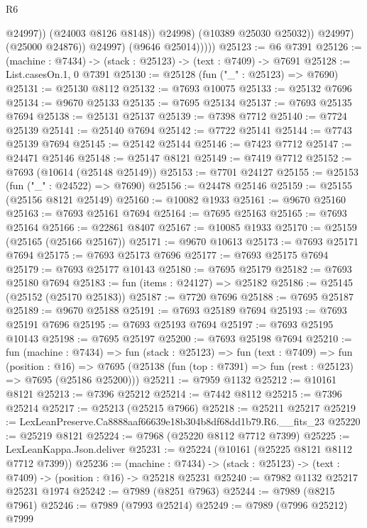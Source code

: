 \begin{lexlean}{R6}
\begin{coremodule}
                            @24997))
                        (@24003 @8126 @8148))
                      @24998)
                    (@10389 @25030 @25032))
                  @24997)
                (@25000 @24876))
              @24997)
            (@9646 @25014)))))
@25123 := @6 @7391
@25126 := (machine : @7434) -> (stack : @25123) -> (text : @7409) -> @7691
@25128 := List.casesOn.{1, 0} @7391
@25130 := @25128 (fun ("_" : @25123) => @7690)
@25131 := @25130 @8112
@25132 := @7693 @10075
@25133 := @25132 @7696
@25134 := @9670 @25133
@25135 := @7695 @25134
@25137 := @7693 @25135 @7694
@25138 := @25131 @25137
@25139 := @7398 @7712
@25140 := @7724 @25139
@25141 := @25140 @7694
@25142 := @7722 @25141
@25144 := @7743 @25139 @7694
@25145 := @25142 @25144
@25146 := @7423 @7712
@25147 := @24471 @25146
@25148 := @25147 @8121
@25149 := @7419 @7712
@25152 := @7693 (@10614 (@25148 @25149))
@25153 := @7701 @24127
@25155 := @25153 (fun ("_" : @24522) => @7690)
@25156 := @24478 @25146
@25159 := @25155 (@25156 @8121 @25149)
@25160 := @10082 @1933
@25161 := @9670 @25160
@25163 := @7693 @25161 @7694
@25164 := @7695 @25163
@25165 := @7693 @25164
@25166 := @22861 @8407
@25167 := @10085 @1933
@25170 := @25159 (@25165 (@25166 @25167))
@25171 := @9670 @10613
@25173 := @7693 @25171 @7694
@25175 := @7693 @25173 @7696
@25177 := @7693 @25175 @7694
@25179 := @7693 @25177 @10143
@25180 := @7695 @25179
@25182 := @7693 @25180 @7694
@25183 := fun (items : @24127) => @25182
@25186 := @25145 (@25152 (@25170 @25183))
@25187 := @7720 @7696
@25188 := @7695 @25187
@25189 := @9670 @25188
@25191 := @7693 @25189 @7694
@25193 := @7693 @25191 @7696
@25195 := @7693 @25193 @7694
@25197 := @7693 @25195 @10143
@25198 := @7695 @25197
@25200 := @7693 @25198 @7694
@25210 := fun (machine : @7434) =>
  fun (stack : @25123) =>
  fun (text : @7409) =>
  fun (position : @16) =>
  @7695 (@25138 (fun (top : @7391) => fun (rest : @25123) => @7695 (@25186 @25200)))
@25211 := @7959 @1132
@25212 := @10161 @8121
@25213 := @7396 @25212
@25214 := @7442 @8112
@25215 := @7396 @25214
@25217 := @25213 (@25215 @7966)
@25218 := @25211 @25217
@25219 := LexLeanPreserve.Ca8888aaf66639e18b304b8df68dd1b79.R6.__fits_23
@25220 := @25219 @8121
@25224 := @7968 (@25220 @8112 @7712 @7399)
@25225 := LexLeanKappa.Json.deliver
@25231 := @25224 (@10161 (@25225 @8121 @8112 @7712 @7399))
@25236 := (machine : @7434) ->
  (stack : @25123) -> (text : @7409) -> (position : @16) -> @25218 @25231
@25240 := @7982 @1132 @25217 @25231 @1974
@25242 := @7989 (@8251 @7963)
@25244 := @7989 (@8215 @7961)
@25246 := @7989 (@7993 @25214)
@25249 := @7989 (@7996 @25212) @7999

\end{coremodule}
\end{lexlean}
